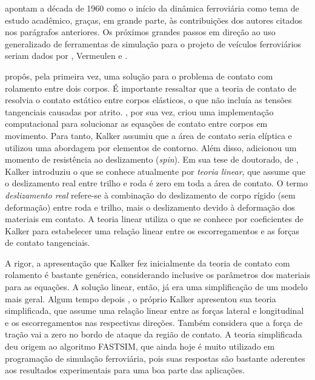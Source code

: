  apontam a década de 1960 como o início da dinâmica ferroviária como tema de estudo acadêmico, 
graças, em grande parte, às contribuições dos autores citados nos parágrafos anteriores. Os próximos grandes passos em direção ao
uso generalizado de ferramentas de simulação para o projeto de veículos ferroviários seriam dados por \citeauthor{johnson_effect_1958}, Vermeulen
e \citeauthor{kalker_rolling_1967}.

 propôs, pela primeira vez, uma solução para o problema de contato com rolamento entre dois corpos.
É importante ressaltar que a teoria de contato de  resolvia o contato estático entre corpos elásticos, o
que não incluía as tensões tangenciais causadas por atrito. , por sua vez, criou uma implementação
computacional para solucionar as equações de contato entre corpos em movimento. Para tanto, Kalker assumiu que a área de contato
seria elíptica e utilizou uma abordagem por elementos de contorno. Além disso, adicionou um momento de resistência ao deslizamento (\textit{spin}). 
Em sua tese de doutorado, de \citeyear{kalker_rolling_1967},
Kalker introduziu o que se conhece atualmente por \textit{teoria linear}, que assume que o deslizamento real entre trilho e roda
é zero em toda a área de contato. O termo
\textit{deslizamento real} refere-se à combinação do deslizamento de corpo rígido (sem deformação) entre roda e trilho, mais o
deslizamento devido à deformação dos materiais em contato. A teoria linear utiliza o que se conhece por coeficientes
de Kalker para estabelecer uma relação linear entre os escorregamentos e as forças de contato tangenciais.

A rigor, a apresentação que Kalker fez inicialmente da teoria de contato com rolamento é bastante genérica, considerando inclusive
os parâmetros dos materiais para as equações. A solução linear, então, já era uma simplificação de um modelo mais geral. Algum tempo depois
, o próprio Kalker apresentou sua teoria simplificada, que assume uma relação linear
entre as forças lateral e longitudinal e os escorregamentos nas respectivas direções. Também considera que a força de tração vai a zero no 
bordo de ataque da região de contato. A teoria simplificada deu origem ao algoritmo FASTSIM, que ainda hoje é muito utilizado em 
programação de simulação ferroviária, pois suas respostas são bastante aderentes aos resultados experimentais para uma boa parte
das aplicações.

